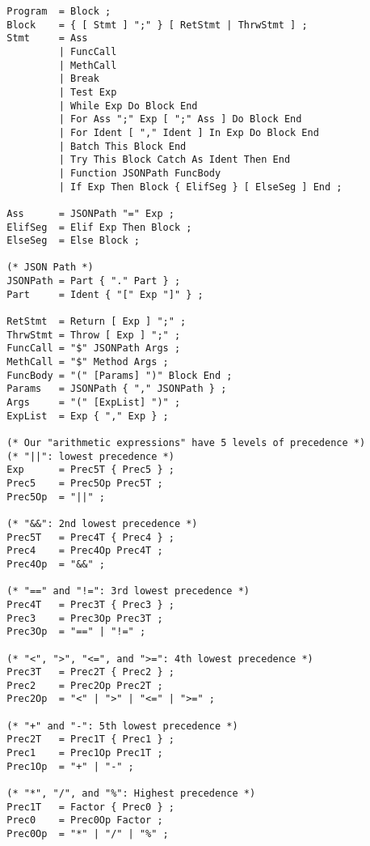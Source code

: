 \documentclass[12pt, letterpaper]{article}
\begin{document}
\begin{center}
    \begin{verbatim}
        Program  = Block ;
        Block    = { [ Stmt ] ";" } [ RetStmt | ThrwStmt ] ;
        Stmt     = Ass
                 | FuncCall
                 | MethCall
                 | Break
                 | Test Exp
                 | While Exp Do Block End
                 | For Ass ";" Exp [ ";" Ass ] Do Block End
                 | For Ident [ "," Ident ] In Exp Do Block End
                 | Batch This Block End
                 | Try This Block Catch As Ident Then End
                 | Function JSONPath FuncBody
                 | If Exp Then Block { ElifSeg } [ ElseSeg ] End ;

        Ass      = JSONPath "=" Exp ;
        ElifSeg  = Elif Exp Then Block ;
        ElseSeg  = Else Block ;

        (* JSON Path *)
        JSONPath = Part { "." Part } ;
        Part     = Ident { "[" Exp "]" } ;

        RetStmt  = Return [ Exp ] ";" ;
        ThrwStmt = Throw [ Exp ] ";" ;
        FuncCall = "$" JSONPath Args ;
        MethCall = "$" Method Args ;
        FuncBody = "(" [Params] ")" Block End ;
        Params   = JSONPath { "," JSONPath } ;
        Args     = "(" [ExpList] ")" ;
        ExpList  = Exp { "," Exp } ;

        (* Our "arithmetic expressions" have 5 levels of precedence *)
        (* "||": lowest precedence *)
        Exp      = Prec5T { Prec5 } ;
        Prec5    = Prec5Op Prec5T ;
        Prec5Op  = "||" ;

        (* "&&": 2nd lowest precedence *)
        Prec5T   = Prec4T { Prec4 } ;
        Prec4    = Prec4Op Prec4T ;
        Prec4Op  = "&&" ;

        (* "==" and "!=": 3rd lowest precedence *)
        Prec4T   = Prec3T { Prec3 } ;
        Prec3    = Prec3Op Prec3T ;
        Prec3Op  = "==" | "!=" ;

        (* "<", ">", "<=", and ">=": 4th lowest precedence *)
        Prec3T   = Prec2T { Prec2 } ;
        Prec2    = Prec2Op Prec2T ;
        Prec2Op  = "<" | ">" | "<=" | ">=" ;

        (* "+" and "-": 5th lowest precedence *)
        Prec2T   = Prec1T { Prec1 } ;
        Prec1    = Prec1Op Prec1T ;
        Prec1Op  = "+" | "-" ;

        (* "*", "/", and "%": Highest precedence *)
        Prec1T   = Factor { Prec0 } ;
        Prec0    = Prec0Op Factor ;
        Prec0Op  = "*" | "/" | "%" ;


\end{verbatim}
\end{center}
\end{document}
